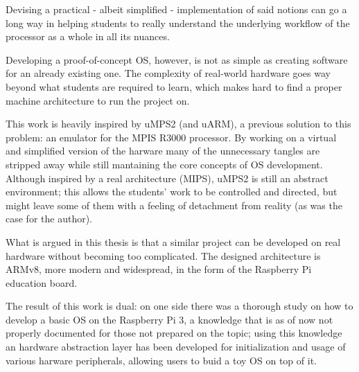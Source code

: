 \documentclass[12pt,a4paper,openright,twoside]{report}
\begin{document}
Devising a practical - albeit simplified - implementation of said notions can
go a long way in helping students to really understand the underlying workflow
of the processor as a whole in all its nuances. 

Developing a proof-of-concept OS, however, is not as simple as creating software for
an already existing one. The complexity of real-world hardware
 goes way beyond what students are required to learn, which makes hard to
 find a proper machine architecture to run the project on.

This work is heavily inspired by uMPS2 (and uARM), a previous solution to this problem:
 an emulator for the MPIS R3000 processor. By working on a virtual and simplified
 version of the harware many of the unnecessary tangles are stripped away while
 still mantaining the core concepts of OS development.
Although inspired by a real architecture (MIPS), uMPS2 is still an abstract 
environment; this allows the students' work to be controlled and directed,
 but might leave some of them with a feeling of detachment from reality
 (as was the case for the author).

What is argued in this thesis is that a similar project can be developed
on real hardware without becoming too complicated. The designed architecture
is ARMv8, more modern and widespread, in the form of the Raspberry Pi education
board.

The result of this work is dual: on one side there was a thorough study on
how to develop a basic OS on the Raspberry Pi 3, a knowledge that is
as of now not properly documented for those not prepared on the topic; using
this knowledge an hardware abstraction layer has been developed for 
initialization and usage of various harware peripherals, allowing users
to buid a toy OS on top of it.

\clearpage{\pagestyle{empty}\cleardoublepage}
\tableofcontents                        %
\rhead[\fancyplain{}{\bfseries\leftmark}]{\fancyplain{}{\bfseries\thepage}}
\clearpage{\pagestyle{empty}\cleardoublepage}
\listoffigures                          %
\clearpage{\pagestyle{empty}\cleardoublepage}
\listoftables                           %
\clearpage{\pagestyle{empty}\cleardoublepage}
\end{document}
